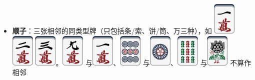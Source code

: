 \documentclass[
	lang=cn,
	color=green
]{elegantbook}
\begin{document}
\begin{remark}
\begin{itemize}
        \item \textbf{顺子}：三张相邻的同类型牌（只包括条/索、饼/筒、万三种），如 \includegraphics[scale=0.5]{images/mahjong/1m.png} \includegraphics[scale=0.5]{images/mahjong/2m.png} \includegraphics[scale=0.5]{images/mahjong/3m.png}。\includegraphics[scale=0.5]{images/mahjong/9m.png} 与\includegraphics[scale=0.5]{images/mahjong/1m.png}、\includegraphics[scale=0.5]{images/mahjong/9p.png} 与\includegraphics[scale=0.5]{images/mahjong/1p.png}、\includegraphics[scale=0.5]{images/mahjong/9s.png} 与\includegraphics[scale=0.5]{images/mahjong/1s.png} 不算作相邻
    \end{itemize}
    
\end{remark}
\end{document}
